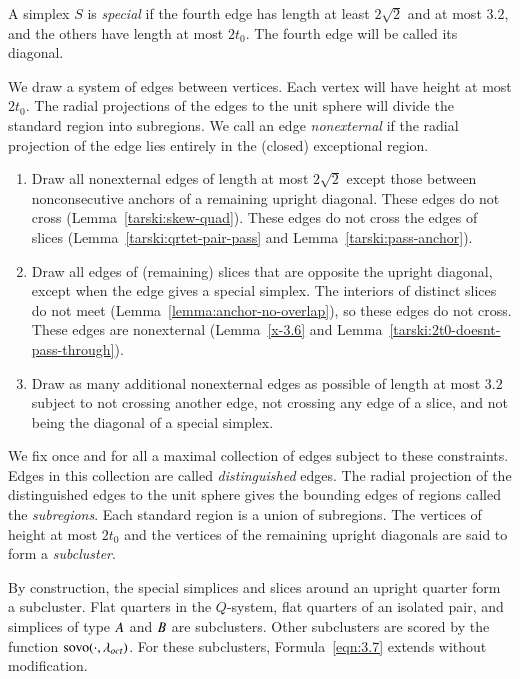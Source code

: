 A simplex $S$ is {\it special\/} if the fourth edge has length at
least $2\sqrt{2}$ and at most $3.2$, and the others have length at
most $2t_0$. The fourth edge will be called its diagonal.


We draw a system of edges between vertices.  Each vertex will have
height at most $2t_0$.  The radial projections of the edges to the
unit sphere will divide the standard region into subregions. We
call an edge {\it nonexternal\/} if the radial projection of the
edge lies entirely in the (closed) exceptional region.

\begin{enumerate}
\item Draw all nonexternal edges of length at most $2\sqrt{2}$
except those between nonconsecutive anchors of a remaining upright
diagonal. These edges do not cross (Lemma~\ref{tarski:skew-quad}).
These edges do not cross the edges of slices
(Lemma~\ref{tarski:qrtet-pair-pass} and
Lemma~\ref{tarski:pass-anchor}).

\item Draw all edges of (remaining) slices
that are opposite the upright diagonal, except when the edge gives
a special simplex. The interiors of distinct slices do
not meet (Lemma~\ref{lemma:anchor-no-overlap}), so these edges do
not cross. These edges are nonexternal (Lemma~\ref{x-3.6} and
Lemma~\ref{tarski:2t0-doesnt-pass-through}).

\item Draw as many additional nonexternal edges as possible of
length at most $3.2$ subject to not crossing another edge, not
crossing any edge of a slice, and not being the
diagonal of a special simplex.
\end{enumerate}

We fix once and for all a maximal collection of edges subject to
these constraints. Edges in this collection are called {\it
distinguished\/} edges. The radial projection of the distinguished
edges to the unit sphere gives the bounding edges of regions
called the {\it subregions}.  Each standard region is a union of
subregions. The vertices of height at most $2t_0$ and the vertices
of the remaining upright diagonals are said to form a {\it
subcluster}.


By construction, the special simplices and slices
around an upright quarter form a subcluster.  Flat quarters in the
$Q$-system, flat quarters of an isolated pair, and simplices of
type $A$ and $B$ are subclusters.  Other subclusters are
scored by the function ${\operatorname{sovo}}(\cdot,\lambda_{oct})$. 
For these subclusters,
Formula~\ref{eqn:3.7} extends without modification.

